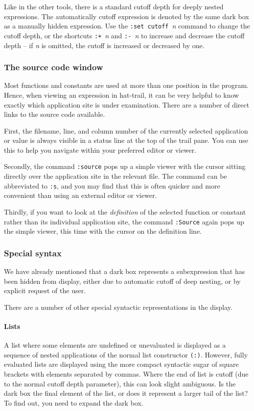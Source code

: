\documentclass[12pt]{article}
\newcommand{\com}[1]{\texttt{#1}}
\begin{document}
Like in the other tools, there is a standard cutoff depth for deeply
nested expressions.  The automatically cutoff expression is denoted by
the same dark box as a manually hidden expression.  Use the \com{:set
cutoff}~\emph{n} command to change the cutoff depth, or the shortcuts
\com{:+}~\emph{n} and \com{:-}~\emph{n} to increase and decrease the
cutoff depth -- if \emph{n} is omitted, the cutoff is increased or
decreased by one.


\subsubsection{The source code window}\label{source}

Most functions and constants are used at more than one position
in the program.  Hence, when viewing an expression in hat-trail,
it can be very helpful to know exactly which application site is
under examination.  There are a number of direct links to the source
code available.

First, the filename, line, and column number of the currently selected
application or value is always visible in a status line at the top
of the trail pane.  You can use this to help you navigate within your
preferred editor or viewer.

Secondly, the command \com{:source} pops up a simple viewer with the
cursor sitting directly over the application site in the relevant file.
The command can be abbreviated to \com{:s}, and you may find that
this is often quicker and more convenient than using an external
editor or viewer.

Thirdly, if you want to look at the \emph{definition} of the selected
function or constant rather than its individual application site,
the command \com{:Source} again pops up the simple viewer, this time
with the cursor on the definition line.


\subsubsection{Special syntax}

We have already mentioned that a dark box represents a subexpression
that has been hidden from display, either due to automatic cutoff of
deep nesting, or by explicit request of the user.

There are a number of other special syntactic representations in
the display.

\paragraph{Lists}
A list where some elements are undefined or unevaluated is displayed
as a sequence of nested applications of the normal list constructor
\texttt{(:)}.  However, fully evaluated lists are displayed using
the more compact syntactic sugar of square brackets with elements
separated by commas.  Where the end of list is cutoff (due to the
normal cutoff depth parameter), this can look slight ambiguous.
Is the dark box the final element of the list, or does it represent a
larger tail of the list?  To find out, you need to expand the dark box.
\end{document}

